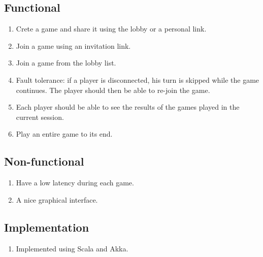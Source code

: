 \documentclass{scrartcl}
\begin{document}
\subsection{Functional}

\begin{enumerate}
    \item Crete a game and share it using the lobby or a personal link.
    \item Join a game using an invitation link.
    \item Join a game from the lobby list.
    \item Fault tolerance: if a player is disconnected, his turn is skipped while the game continues. The player should then be able to re-join the game.
    \item Each player should be able to see the results of the games played in the current session.
    \item Play an entire game to its end.  
\end{enumerate}

\subsection{Non-functional}

\begin{enumerate}
    \item Have a low latency during each game.
    \item A nice graphical interface.
\end{enumerate}

\subsection{Implementation}

\begin{enumerate}
    \item Implemented using Scala and Akka.
\end{enumerate}
\end{document}
